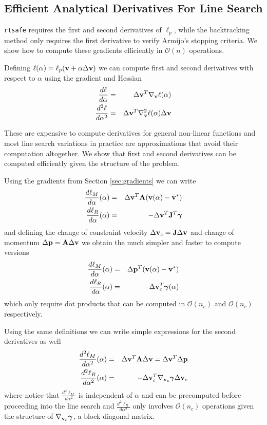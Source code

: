 \subsection{Efficient Analytical Derivatives For Line Search}

\verb;rtsafe; requires the first and second derivatives of $\ell_p$, while the
backtracking method only requires the first derivative to verify Armijo's
stopping criteria. We show how to compute these gradients efficiently in
$\mathcal{O}(n)$ operations.

Defining $\ell(\alpha) = \ell_p({\mathbf{v}}+\alpha\Delta{\mathbf{v}})$ we can compute first
and second derivatives with respect to $\alpha$ using the gradient and Hessian
\begin{eqnarray}
	\frac{d\ell}{d\alpha}&=&\Delta{\mathbf{v}}^T\nabla_{\mathbf{v}}\ell(\alpha)\nonumber\\
	\frac{d^2\ell}{d\alpha^2}&=&\Delta{\mathbf{v}}^T\nabla_{\mathbf{v}}^2\ell(\alpha)\Delta{\mathbf{v}}\nonumber
\end{eqnarray}

These are expensive to compute derivatives for general non-linear functions and
most line search variations in practice are approximations that avoid their
computation altogether. We show that first and second derivatives can be
computed efficiently given the structure of the problem.

Using the gradients from Section \ref{sec:gradients} we can write
\begin{eqnarray}
	\frac{d\ell_M}{d\alpha}(\alpha)&=&\Delta{\mathbf{v}}^T{\mathbf{A}}({\mathbf{v}}(\alpha)-{\mathbf{v}}^*)\\
	\frac{d\ell_R}{d\alpha}(\alpha)&=&-\Delta{\mathbf{v}}^T{\mathbf{J}}^T{\bm\gamma}
\end{eqnarray}
and defining the change of constraint velocity
$\Delta{\mathbf{v}}_c={\mathbf{J}}\Delta{\mathbf{v}}$ and change of momentum $\Delta{\mathbf{p}} =
{\mathbf{A}}\Delta{\mathbf{v}}$ we obtain the much simpler and faster to compute versions
\begin{eqnarray}
	\frac{d\ell_M}{d\alpha}(\alpha)&=&\Delta{\mathbf{p}}^T({\mathbf{v}}(\alpha)-{\mathbf{v}}^*)\\
	\frac{d\ell_R}{d\alpha}(\alpha)&=&-\Delta{\mathbf{v}}_c^T{\bm\gamma}(\alpha)
\end{eqnarray}
which only require dot products that can be computed in $\mathcal{O}(n_v)$ and
$\mathcal{O}(n_c)$ respectively.

Using the same definitions we can write simple expressions for the second
derivatives as well
\begin{eqnarray}
	\frac{d^2\ell_M}{d\alpha^2}(\alpha)&=&\Delta{\mathbf{v}}^T{\mathbf{A}}\Delta{\mathbf{v}}=\Delta{\mathbf{v}}^T\Delta{\mathbf{p}}\\
	\frac{d^2\ell_R}{d\alpha^2}(\alpha)&=&-\Delta{\mathbf{v}}_c^T
	\nabla_{{\mathbf{v}}_c}{\bm\gamma}\Delta{\mathbf{v}}_c
\end{eqnarray}
where notice that $\frac{d^2\ell_M}{d\alpha^2}$ is independent of $\alpha$ and
can be precomputed before proceeding into the line search and
$\frac{d^2\ell_R}{d\alpha^2}$ only involves $\mathcal{O}(n_c)$ operations given
the structure of $\nabla_{{\mathbf{v}}_c}{\bm\gamma}$, a block diagonal matrix.

